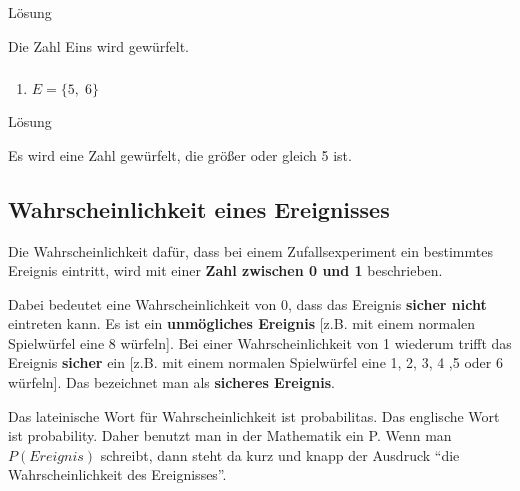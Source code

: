\documentclass[
  ngerman,
]{book}
\providecommand{\tightlist}{%
  \setlength{\itemsep}{0pt}\setlength{\parskip}{0pt}}
\begin{document}
Lösung

Die Zahl Eins wird gewürfelt.

\hypertarget{section-62}{%
\subsubsection*{}\label{section-62}}

\begin{enumerate}
\def\labelenumi{\alph{enumi})}
\setcounter{enumi}{3}
\tightlist
\item
  \(E=\{5,\;6\}\)
\end{enumerate}

Lösung

Es wird eine Zahl gewürfelt, die größer oder gleich 5 ist.

\hypertarget{section-63}{%
\subsubsection*{}\label{section-63}}

\hypertarget{section-64}{%
\subsubsection*{}\label{section-64}}

\hypertarget{wahrscheinlichkeit-eines-ereignisses}{%
\subsection*{Wahrscheinlichkeit eines Ereignisses}\label{wahrscheinlichkeit-eines-ereignisses}}

Die Wahrscheinlichkeit dafür, dass bei einem Zufallsexperiment ein bestimmtes Ereignis eintritt, wird mit einer \textbf{Zahl zwischen 0 und 1} beschrieben.

Dabei bedeutet eine Wahrscheinlichkeit von 0, dass das Ereignis \textbf{sicher nicht} eintreten kann. Es ist ein \textbf{unmögliches Ereignis} {[}z.B. mit einem normalen Spielwürfel eine 8 würfeln{]}. Bei einer Wahrscheinlichkeit von 1 wiederum trifft das Ereignis \textbf{sicher} ein {[}z.B. mit einem normalen Spielwürfel eine 1, 2, 3, 4 ,5 oder 6 würfeln{]}. Das bezeichnet man als \textbf{sicheres Ereignis}.

Das lateinische Wort für Wahrscheinlichkeit ist probabilitas. Das englische Wort ist probability. Daher benutzt man in der Mathematik ein P. Wenn man \(P(Ereignis)\) schreibt, dann steht da kurz und knapp der Ausdruck ``die Wahrscheinlichkeit des Ereignisses''.
\end{document}
